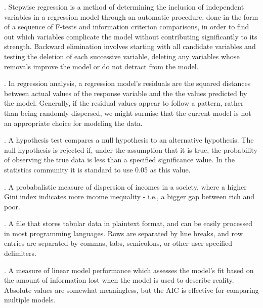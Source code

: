 \documentclass[oneside,12pt]{report}
\begin{document}
\vspace{8pt} . Stepwise regression is a method of determining the inclusion of independent variables in a regression model through an automatic procedure, done in the form of a sequence of F-tests and information criterion comparisons, in order to find out which variables complicate the model without contributing significantly to its strength. Backward elimination involves starting with all candidate variables and testing the deletion of each successive variable, deleting any variables whose removals improve the model or do not detract from the model.

\vspace{8pt} . In regression analysis, a regression model's residuals are the squared distances between actual values of the response variable and the the values predicted by the model. Generally, if the residual values appear to follow a pattern, rather than being randomly dispersed, we might surmise that the current model is not an appropriate choice for modeling the data.

\vspace{8pt} . A hypothesis test compares a null hypothesis to an alternative hypothesis. The null hypothesis is rejected if, under the assumption that it is true, the probability of observing the true data is less than a specified significance value. In the statistics community it is standard to use 0.05 as this value.

\vspace{8pt} . A probabalistic measure of dispersion of incomes in a society, where a higher Gini index indicates more income inequality - i.e., a bigger gap between rich and poor.

\vspace{8pt} . A file that stores tabular data in plaintext format, and can be easily processed in most programming languages. Rows are separated by line breaks, and row entries are separated by commas, tabs, semicolons, or other user-specified delimiters.

\vspace{8pt} . A measure of linear model performance which assesses the model's fit based on the amount of information lost when the model is used to describe reality. Absolute values are somewhat meaningless, but the AIC is effective for comparing multiple models.
\end{document}
